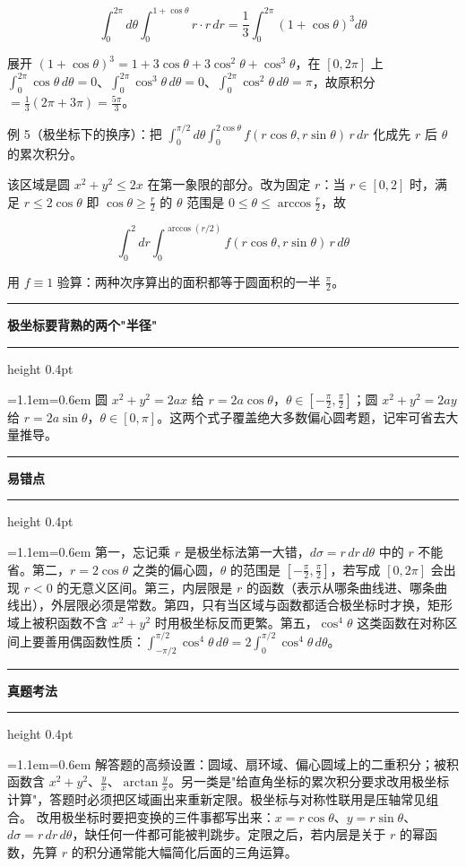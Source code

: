 \documentclass[11pt,openany,UTF8]{ctexbook}
\newcommand{\callouthead}[2]{%
  \par\addvspace{7pt}\noindent
  {\color{#1}\rule[-0.15em]{3pt}{1.05em}}\hspace{0.5em}%
  {\bfseries\color{#1}#2}\par\nobreak\vspace{-0.35em}%
  {\color{rulesep}\hrule height 0.4pt}\nobreak\vspace{0.45em}%
  \begingroup\small\setlength{\parindent}{0pt}%
  \leftskip=1.1em\rightskip=0.6em\noindent\ignorespaces}
\newcommand{\calloutend}{\par\endgroup\addvspace{7pt}}
\newenvironment{callkey}[1]{\callouthead{keybar}{#1}}{\calloutend}
\newenvironment{callwarn}[1]{\callouthead{warnbar}{#1}}{\calloutend}
\newenvironment{callexam}[1]{\callouthead{exambar}{#1}}{\calloutend}
\begin{document}
\[\int_{0}^{2\pi}d\theta\int_{0}^{1+\cos\theta}r\cdot r\,dr=\frac13\int_{0}^{2\pi}(1+\cos\theta)^{3}d\theta\]

展开 $(1+\cos\theta)^{3}=1+3\cos\theta+3\cos^{2}\theta+\cos^{3}\theta$，在 $[0,2\pi]$ 上 $\int_{0}^{2\pi}\cos\theta\,d\theta=0$、$\int_{0}^{2\pi}\cos^{3}\theta\,d\theta=0$、$\int_{0}^{2\pi}\cos^{2}\theta\,d\theta=\pi$，故原积分 $=\frac13\left(2\pi+3\pi\right)=\frac{5\pi}{3}$。

例 5（极坐标下的换序）：把 $\displaystyle\int_{0}^{\pi/2}d\theta\int_{0}^{2\cos\theta}f(r\cos\theta,r\sin\theta)\,r\,dr$ 化成先 $r$ 后 $\theta$ 的累次积分。

该区域是圆 $x^{2}+y^{2}\le 2x$ 在第一象限的部分。改为固定 $r$：当 $r\in[0,2]$ 时，满足 $r\le 2\cos\theta$ 即 $\cos\theta\ge\frac r2$ 的 $\theta$ 范围是 $0\le\theta\le\arccos\frac r2$，故

\[\int_{0}^{2}dr\int_{0}^{\arccos(r/2)}f(r\cos\theta,r\sin\theta)\,r\,d\theta\]

用 $f\equiv 1$ 验算：两种次序算出的面积都等于圆面积的一半 $\frac{\pi}{2}$。

\begin{callkey}{极坐标要背熟的两个"半径"}
圆 $x^{2}+y^{2}=2ax$ 给 $r=2a\cos\theta$，$\theta\in\left[-\frac{\pi}{2},\frac{\pi}{2}\right]$；圆 $x^{2}+y^{2}=2ay$ 给 $r=2a\sin\theta$，$\theta\in[0,\pi]$。这两个式子覆盖绝大多数偏心圆考题，记牢可省去大量推导。

\end{callkey}

\begin{callwarn}{易错点}
第一，忘记乘 $r$ 是极坐标法第一大错，$d\sigma=r\,dr\,d\theta$ 中的 $r$ 不能省。第二，$r=2\cos\theta$ 之类的偏心圆，$\theta$ 的范围是 $\left[-\frac{\pi}{2},\frac{\pi}{2}\right]$，若写成 $[0,2\pi]$ 会出现 $r<0$ 的无意义区间。第三，内层限是 $r$ 的函数（表示从哪条曲线进、哪条曲线出），外层限必须是常数。第四，只有当区域与函数都适合极坐标时才换，矩形域上被积函数不含 $x^{2}+y^{2}$ 时用极坐标反而更繁。第五，$\cos^{4}\theta$ 这类函数在对称区间上要善用偶函数性质：$\int_{-\pi/2}^{\pi/2}\cos^{4}\theta\,d\theta=2\int_{0}^{\pi/2}\cos^{4}\theta\,d\theta$。

\end{callwarn}

\begin{callexam}{真题考法}
解答题的高频设置：圆域、扇环域、偏心圆域上的二重积分；被积函数含 $x^{2}+y^{2}$、$\frac{y}{x}$、$\arctan\frac yx$。另一类是"给直角坐标的累次积分要求改用极坐标计算"，答题时必须把区域画出来重新定限。极坐标与对称性联用是压轴常见组合。 改用极坐标时要把变换的三件事都写出来：$x=r\cos\theta$、$y=r\sin\theta$、$d\sigma=r\,dr\,d\theta$，缺任何一件都可能被判跳步。定限之后，若内层是关于 $r$ 的幂函数，先算 $r$ 的积分通常能大幅简化后面的三角运算。

\end{callexam}
\end{document}

